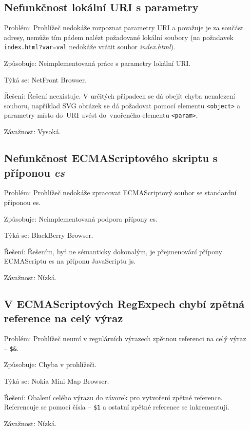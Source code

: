 \subsection{Nefunkčnost lokální URI s parametry}
\begin{description*}
\item[Problém:] Prohlížeč nedokáže rozpoznat parametry URI a považuje je za součást adresy, nemůže tím pádem nalézt požadované lokální soubory (na požadavek \texttt{index.html?var=val} nedokáže vrátit soubor \emph{index.html}).
\item[Způsobuje:] Neimplementovaná práce s parametry lokální URI.
\item[Týká se:] NetFront Browser.
\item[Řešení:] Řešení neexistuje. V určitých případech se dá obejít chyba nenalezení souboru, například SVG obrázek se dá požadovat pomocí elementu \texttt{<object>} a parametry místo do~URI uvést do~vnořeného elementu \texttt{<param>}.
\item[Závažnost:] Vysoká.
\end{description*}

\subsection{Nefunkčnost ECMAScriptového skriptu s příponou \emph{es}}
\begin{description*}
\item[Problém:] Prohlížeč nedokáže zpracovat ECMAScriptový soubor se standardní příponou es.
\item[Způsobuje:] Neimplementovaná podpora přípony es.
\item[Týká se:] BlackBerry Browser.
\item[Řešení:] Řešením, byť ne sémanticky dokonalým, je přejmenování přípony ECMAScriptu es na příponu JavaScriptu js.
\item[Závažnost:] Nízká.
\end{description*}

\subsection{V ECMAScriptových RegExpech chybí zpětná reference na celý výraz}
\begin{description*}
\item[Problém:] Prohlížeč neumí v regulárních výrazech zpětnou referenci na celý výraz -- \texttt{\$\&}.
\item[Způsobuje:] Chyba v prohlížeči.
\item[Týká se:] Nokia Mini Map Browser.
\item[Řešení:] Obalení celého výrazu do závorek pro vytvoření zpětné reference. Referencuje se pomocí čísla -- \texttt{\$1} a ostatní zpětné reference se inkrementují.
\item[Závažnost:] Nízká.
\end{description*}

